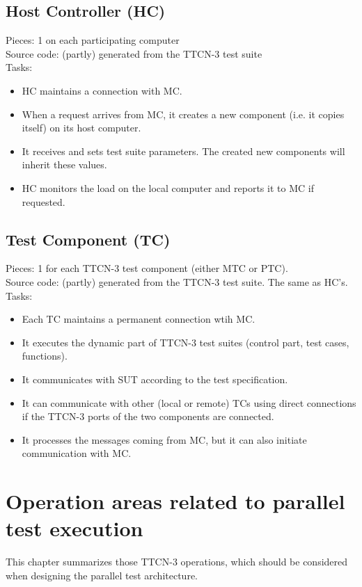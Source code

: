 \documentclass[a4paper,10pt]{article}
\begin{document}
\subsection{Host Controller (HC)}
Pieces: 1 on each participating computer \\
Source code: (partly) generated from the TTCN-3 test suite \\
Tasks:
\begin{itemize}
\item HC maintains a connection with MC.
\item When a request arrives from MC, it creates a new component (i.e. it copies itself) on its host computer.
\item It receives and sets test suite parameters. The created new components will inherit these values.
\item HC monitors the load on the local computer and reports it to MC if requested.
\end{itemize}

\subsection{Test Component (TC)}
Pieces: 1 for each TTCN-3 test component (either MTC or PTC). \\
Source code: (partly) generated from the TTCN-3 test suite. The same as HC's. \\
Tasks:
\begin{itemize}
\item Each TC maintains a permanent connection wtih MC.
\item It executes the dynamic part of TTCN-3 test suites (control part, test cases, functions).
\item It communicates with SUT according to the test specification.
\item It can communicate with other (local or remote) TCs using direct connections if the TTCN-3 ports of the two components are connected.
\item It processes the messages coming from MC, but it can also initiate communication with MC.
\end{itemize}

\section{Operation areas related to parallel test execution}
This chapter summarizes those TTCN-3 operations, which should be considered when designing the parallel test architecture.
\end{document}
